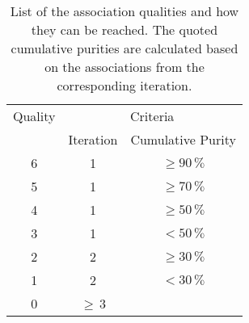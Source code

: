 
\begin{table}[h]
\begin{center}
\caption[Overview of the possible association qualities and how they can be obtained]{List of the association qualities and how they can be reached. The quoted cumulative purities are calculated based on the associations from the corresponding iteration.}
\label{tab:AMWFQD}
\begin{tabular}{c c c}
Quality & \multicolumn{2}{c}{Criteria} \\
 & Iteration & Cumulative Purity \\
\midrule[2pt]
6 & 1 & $\geq 90\,\%$ \\
5 & 1 & $\geq 70\,\%$ \\
4 & 1 & $\geq 50\,\%$ \\
3 & 1 & $< 50\,\%$ \\
\midrule
2 & 2 & $\geq 30\,\%$ \\
1 & 2 & $< 30\,\%$ \\
\midrule
0 & $\geq$\,3 & \\
\end{tabular}
\end{center}
\end{table}
